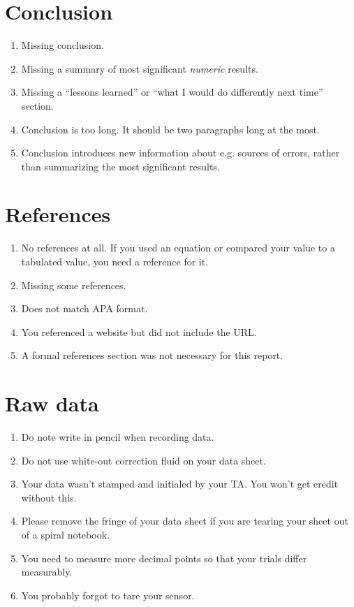 \documentclass[12pt,letterpaper]{article}
\begin{document}
\begin{multicols}{2}
\section{Conclusion}

\begin{enumerate}[start=140]
  \item Missing conclusion.
  \item Missing a summary of most significant \emph{numeric} results.
  \item Missing a ``lessons learned'' or
    ``what I would do differently next time'' section.
  \item Conclusion is too long.
    It should be two paragraphs long at the most.
  \item Conclusion introduces new information about e.g. sources of errors,
    rather than summarizing the most significant results.
\end{enumerate}

\section{References}

\begin{enumerate}[start=150]
  \item No references at all.
    If you used an equation or compared your value to a tabulated value,
    you need a reference for it.
  \item Missing some references.
  \item Does not match APA format.
  \item You referenced a website but did not include the URL.
  \item A formal references section was not necessary for this report.
\end{enumerate}

\section*{Raw data}

\begin{enumerate}[start=160]
  \item Do note write in pencil when recording data.
  \item Do not use white-out correction fluid on your data sheet.
  \item Your data wasn't stamped and initialed by your TA.
    You won't get credit without this.
  \item Please remove the fringe of your data sheet
    if you are tearing your sheet out of a spiral notebook.
  \item You need to measure more decimal points
    so that your trials differ measurably.
  \item You probably forgot to tare your sensor.
\end{enumerate}


\end{multicols}
\end{document}
